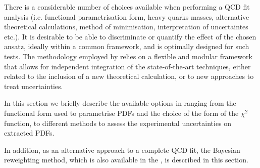 


There is a considerable number of choices available when performing a QCD fit analysis 
(i.e. functional parametrisation form, heavy quarks masses, alternative theoretical calculations,
method of minimisation, interpretation of uncertaintes etc.).
%
 It is desirable to be able to discriminate or quantify the effect of the chosen ansatz, ideally within a common framework, and 
\fitter is optimally designed for such tests.
%
The methodology employed by \fitter  relies on a flexible and modular
framework that allows for independent integration of the state-of-the-art techniques, either related to the inclusion of a new theoretical calculation, or to new approaches to treat uncertainties. 
%

In this section we briefly describe the available options in \fitter ranging from the functional form used to parametrise PDFs and the choice of the form of the $\chi^2$ function, to different methods to assess the experimental uncertainties on extracted PDFs.

In addition, as an alternative approach to a complete QCD fit,  the Bayesian reweighting
method, which is also available in the \fitter, is described in this section. 



